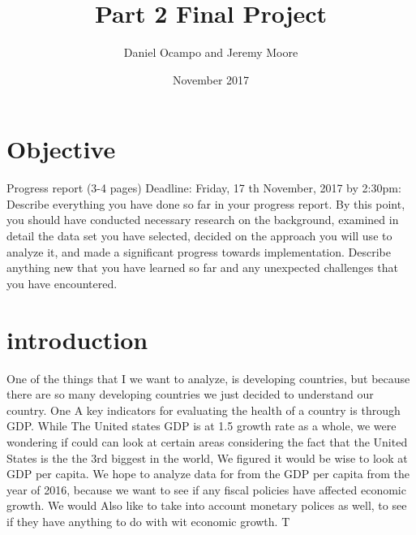 \documentclass{article}
\title{Part 2 Final Project}
\author{Daniel Ocampo and Jeremy Moore }
\date{November 2017}
\begin{document}
\maketitle

\section{Objective}

Progress report (3-4 pages) Deadline: Friday, 17 th November, 2017 by 2:30pm:
Describe everything you have done so far in your progress report. By this point, you should
have conducted necessary research on the background, examined in detail the data set you
have selected, decided on the approach you will use to analyze it, and made a significant
progress towards implementation. Describe anything new that you have learned so far and
any unexpected challenges that you have encountered.

\section{introduction}

One of the things that I we want to analyze,  is developing countries, but because there are so many developing countries we just decided to understand our country. One A key indicators for evaluating the health of a country is through GDP.  While The United states GDP is at 1.5 growth rate as a whole, we were wondering if could can look at certain areas considering the fact that the United States is the the 3rd biggest in the world, We figured it would be wise to look at GDP per capita. We hope to analyze data for from the GDP per capita from the year of 2016, because we want to see if any fiscal policies have affected economic growth. We would Also like to take into account monetary polices as well, to see if they have anything to do with wit economic growth. T
\end{document}
